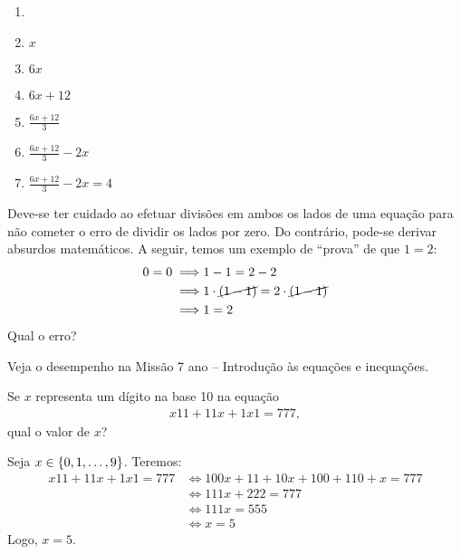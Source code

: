 \begin{solution}
\begin{enumerate}[label=\textbf{\arabic*}.]
	\item[]
	\item $x$
	\item $6x$
	\item $6x+12$
	\item $\frac{6x+12}{3}$
	\item $\frac{6x+12}{3} - 2x$
	\item $\frac{6x+12}{3} - 2x = 4$
\end{enumerate}
\end{solution}

\begin{remark}
Deve-se ter  cuidado ao efetuar divisões em ambos os lados de uma equação para não cometer o erro de dividir os lados por zero. Do contrário, pode-se derivar absurdos matemáticos. A seguir, temos um exemplo de ``prova'' de que $1=2$:
%
\begin{align*}
0=0 \implies & 1-1=2-2 \\
	\implies & 1\cdot\cancel{(1-1)}=2\cdot\cancel{(1-1)} \\
	\implies & 1=2 
\end{align*}
%
Qual o erro?
\end{remark}

\begin{onlineact}
Veja o desempenho na Missão 7\tdeg{} ano -- Introdução às equações e inequações.
\end{onlineact}

\begin{example}
Se $x$ representa um dígito na base 10 na equação
%
\begin{align*}
x11 + 11x + 1x1 =777,
\end{align*}
%
 qual o valor de $x$?
\end{example}

\begin{solution}
Seja $x \in \left\{0,1,\ldots, 9\right\}$. Teremos:
%
\begin{align*}
x11 + 11x + 1x1 =777 & \iff 100x + 11 + 10x + 100 + 110 + x = 777 \\
	& \iff 111x+222 = 777 \\
	& \iff 111x = 555 \\
	& \iff x=5 
\end{align*}
%
Logo, $x=5$.
\end{solution}

